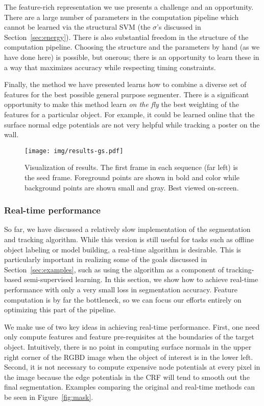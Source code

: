 \documentclass[journal]{IEEEtran}
\begin{document}
The feature-rich representation we use presents a challenge and an opportunity.  There are a large number of parameters in the computation pipeline which cannot be learned via the structural SVM (\eg the $\sigma$'s discussed in Section~\ref{sec:energy}). There is also substantial freedom in the structure of the computation pipeline.  Choosing the structure and the parameters by hand (as we have done here) is possible, but onerous; there is an opportunity to learn these in a way that maximizes accuracy while respecting timing constraints.

Finally, the method we have presented learns how to combine a diverse set of features for the best possible general purpose segmenter.  There is a significant opportunity to make this method learn \emph{on the fly} the best weighting of the features for a particular object.  For example, it could be learned online that the surface normal edge potentials are not very helpful while tracking a poster on the wall.


\begin{figure*}
  \centering
  \vspace{1cm}
  \texttt{[image: img/results-gs.pdf]}
  \caption{Visualization of results.  The first frame in each sequence (far left) is the seed frame.  Foreground points are shown in bold and color while background points are shown small and gray. Best viewed on-screen.}
  \label{fig:results}
  \vspace{50pt}
\end{figure*}


\subsubsection{Real-time performance}
\label{sec:realtime}

So far, we have discussed a relatively slow implementation of the segmentation and tracking algorithm.   While this version is still useful for tasks such as offline object labeling or model building, a real-time algorithm is desirable.  This is particularly important in realizing some of the goals discussed in Section~\ref{sec:examples}, such as using the algorithm as a component of tracking-based semi-supervised learning.  In this section, we show how to achieve real-time performance with only a very small loss in segmentation accuracy.  Feature computation is by far the bottleneck, so we can focus our efforts entirely on optimizing this part of the pipeline.

We make use of two key ideas in achieving real-time performance.  First, one need only compute features and feature pre-requisites at the boundaries of the target object.  Intuitively, there is no point in computing surface normals in the upper right corner of the RGBD image when the object of interest is in the lower left.  Second, it is not necessary to compute expensive node potentials at every pixel in the image because the edge potentials in the CRF will tend to smooth out the final segmentation.  Examples comparing the original and real-time methods can be seen in Figure~\ref{fig:mask}.
\end{document}

